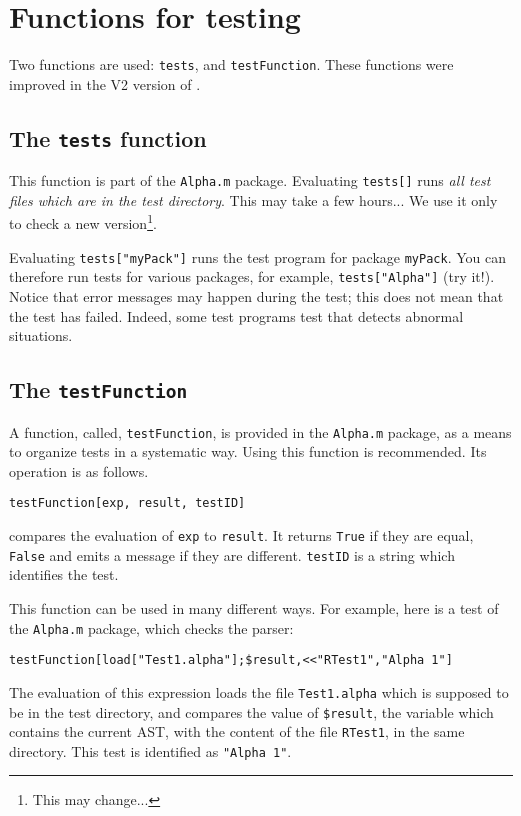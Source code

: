 \documentclass[12pt]{article}
\begin{document}
\section{Functions for testing}
Two functions are used: \texttt{tests}, and \texttt{testFunction}. These
functions were improved in the V2 version of \MMAlpha{}. 

\subsection{The \texttt{tests} function}
This function is part of the \texttt{Alpha.m} package. 
Evaluating \texttt{tests[]} runs {\em all test files which
are in the test directory}. This may take a few hours... We
use it only to check a new version\footnote{This may change...}.

Evaluating \texttt{tests["myPack"]} runs the test program
for package \texttt{myPack}. You can therefore run tests 
for various \MMAlpha{} packages, for example, \texttt{tests["Alpha"]}
(try it!). 
Notice that \MMA{} error messages may happen during the test; this
does not mean that the test has failed. Indeed, some test programs
test that \MMAlpha{} detects abnormal situations. 

\subsection{The \texttt{testFunction}}
A function, called, \texttt{testFunction}, is provided in 
the \texttt{Alpha.m} package, as a means to organize tests
in a systematic way. Using this function is recommended. Its operation
is as follows. 
\begin{verbatim}
testFunction[exp, result, testID]
\end{verbatim}
compares the evaluation of \texttt{exp} to \texttt{result}.
It returns 
\texttt{True} if they are equal, 
\texttt{False} and emits a message if they are different.
\texttt{testID} is a string which identifies the test.

This function can be used in many different ways. For example, 
here is a test of the \texttt{Alpha.m} package, which checks 
the \MMAlpha{} parser: 
\begin{verbatim}
testFunction[load["Test1.alpha"];$result,<<"RTest1","Alpha 1"]
\end{verbatim}
The evaluation of this expression loads the file \texttt{Test1.alpha}
which is supposed to be in the test directory, and compares the 
value of \texttt{\$result}, the \MMAlpha{} variable which contains
the current AST, with the content of the file \texttt{RTest1}, 
in the same directory. This test is identified as \texttt{"Alpha 1"}.
\end{document}
